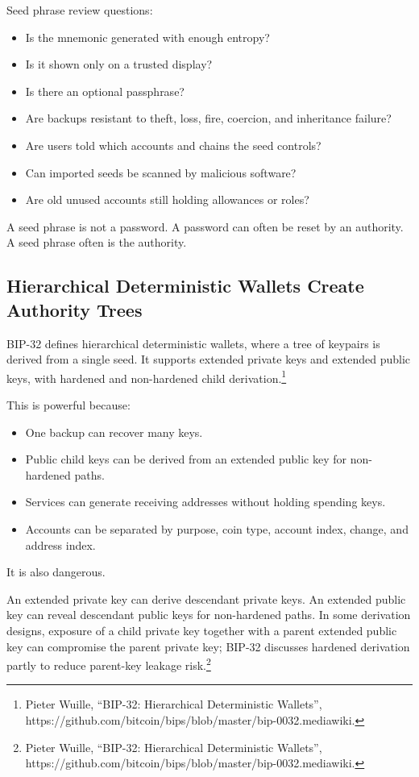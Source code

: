 Seed phrase review questions:

\begin{itemize}
\tightlist
\item
  Is the mnemonic generated with enough entropy?
\item
  Is it shown only on a trusted display?
\item
  Is there an optional passphrase?
\item
  Are backups resistant to theft, loss, fire, coercion, and inheritance
  failure?
\item
  Are users told which accounts and chains the seed controls?
\item
  Can imported seeds be scanned by malicious software?
\item
  Are old unused accounts still holding allowances or roles?
\end{itemize}

A seed phrase is not a password. A password can often be reset by an
authority. A seed phrase often is the authority.

\subsection{Hierarchical Deterministic Wallets Create Authority Trees}

BIP-32 defines hierarchical deterministic wallets, where a tree of
keypairs is derived from a single seed. It supports extended private
keys and extended public keys, with hardened and non-hardened child
derivation.\footnote{Pieter Wuille, ``BIP-32: Hierarchical Deterministic
  Wallets'',
  https://github.com/bitcoin/bips/blob/master/bip-0032.mediawiki.}

This is powerful because:

\begin{itemize}
\tightlist
\item
  One backup can recover many keys.
\item
  Public child keys can be derived from an extended public key for
  non-hardened paths.
\item
  Services can generate receiving addresses without holding spending
  keys.
\item
  Accounts can be separated by purpose, coin type, account index,
  change, and address index.
\end{itemize}

It is also dangerous.

An extended private key can derive descendant private keys. An extended
public key can reveal descendant public keys for non-hardened paths. In
some derivation designs, exposure of a child private key together with a
parent extended public key can compromise the parent private key; BIP-32
discusses hardened derivation partly to reduce parent-key leakage
risk.\footnote{Pieter Wuille, ``BIP-32: Hierarchical Deterministic
  Wallets'',
  https://github.com/bitcoin/bips/blob/master/bip-0032.mediawiki.}

